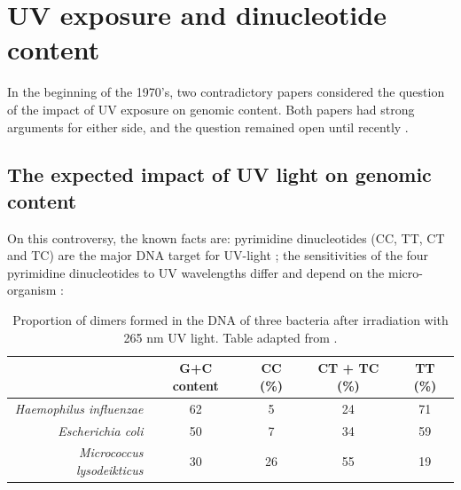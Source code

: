 \documentclass{article}
\begin{document}
\section{UV exposure and dinucleotide content}

In the beginning of the 1970's, two contradictory papers considered
the question of the impact of UV exposure on genomic content. Both
papers had strong arguments for either side, and the question remained
open until recently \cite{UV}.

\subsection{The expected impact of UV light on genomic content}

On this controversy, the known facts are: pyrimidine dinucleotides
(CC, TT, CT and TC) are the major DNA target for UV-light
\cite{Setlow}; the sensitivities of the four pyrimidine dinucleotides
to UV wavelengths differ and depend on the micro-organism
\cite{Setlow}:

\begin{table}[H]
\begin{center}
\begin{tabular}{rcccc}
  \hline
  & G+C content & CC (\%) & CT + TC (\%) & TT (\%)\\
  \hline
  \textit{Haemophilus influenzae} & 62 & 5 & 24 & 71 \\
  \hline
  \textit{Escherichia coli} & 50 & 7 & 34 & 59 \\
  \hline
  \textit{Micrococcus lysodeikticus} & 30 & 26 & 55 & 19 \\
  \hline
\end{tabular}
\caption{Proportion of dimers formed in the DNA of three bacteria
  after irradiation with 265 nm UV light. Table adapted from
  \cite{Setlow}.}
\label{sensitivity}
\end{center}
\end{table}

\end{document}
